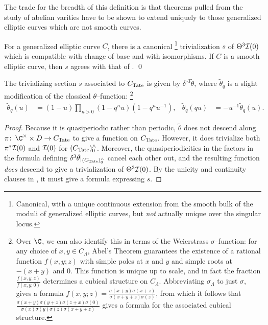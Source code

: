 \noindent The trade for the breadth of this definition is that theorems pulled from the study of abelian varities have to be shown to extend uniquely to those generalized elliptic curves which are not smooth curves.

\begin{theorem}\label{GeneralizedTheta3IsTrivial}
For a generalized elliptic curve \(C\), there is a canonical%
\footnote{%
Canonical, with a unique continuous extension from the smooth bulk of the moduli of generalized elliptic curves, but \emph{not} actually unique over the singular locus.
}
trivialization \(s\) of \(\Theta^3 \mathcal{I}(0)\) which is compatible with change of base and with isomorphisms.
If \(C\) is a smooth elliptic curve, then \(s\) agrees with that of . \qed
\end{theorem}

\begin{corollary}\label{D3thetaTrivializes}
The trivializing section \(s\) associated to \(C_{\mathrm{Tate}}\) is given by \(\delta^{\circ 3} \tilde \theta\), where \(\tilde \theta_q\) is a slight modification of the classical \(\theta\)--function:%
\footnote{%
Over \(\C\), we can also identify this in terms of the Weierstrass \(\sigma\)--function: for any choice of \(x, y \in C_\Lambda\), Abel's Theorem guarantees the existence of a rational function \(f(x, y; z)\) with simple poles at \(x\) and \(y\) and simple roots at \(-(x+y)\) and \(0\).
This function is unique up to scale, and in fact the fraction \(\frac{f(x,y;z)}{f(x,y;0)}\) determines a cubical structure on \(C_\Lambda\).
Abbreviating \(\sigma_\Lambda\) to just \(\sigma\),  gives a formula \(f(x,y;z) = \frac{\sigma(x+y)\sigma(x+z)}{\sigma(x+y+z)\sigma(z)}\), from which it follows that \(\frac{\sigma(x+y)\sigma(y+z)\sigma(z+x)\sigma(0)}{\sigma(x)\sigma(y)\sigma(z)\sigma(x+y+z)}\) gives a formula for the associated cubical structure.
}
\begin{align*}
\tilde \theta_q(u) & = (1 - u)\prod_{n > 0}(1 - q^n u)(1 - q^n u^{-1}), &
\tilde \theta_q(qu) & = -u^{-1} \tilde\theta_q(u).
\end{align*}
\end{corollary}
\begin{proof}
Because it is quasiperiodic rather than periodic, \(\tilde \theta\) does not descend along \(\pi\co \C^\times \times D \to C_{\Tate}\) to give a function on \(C_{\mathrm{Tate}}\).
However, it does trivialize both \(\pi^* \mathcal{I}(0)\) and \(\mathcal{I}(0)\) for \((C_{\mathrm{Tate}})^\wedge_0\).
Moreover, the quasiperiodicities in the factors in the formula defining \(\delta^3 \tilde \theta|_{(C_{\mathrm{Tate}})^\wedge_0}\) cancel each other out, and the resulting function \emph{does} descend to give a trivialization of \(\Theta^3 \mathcal{I}(0)\).
By the unicity and continuity clauses in , it must give a formula expressing \(s\).
\end{proof}

